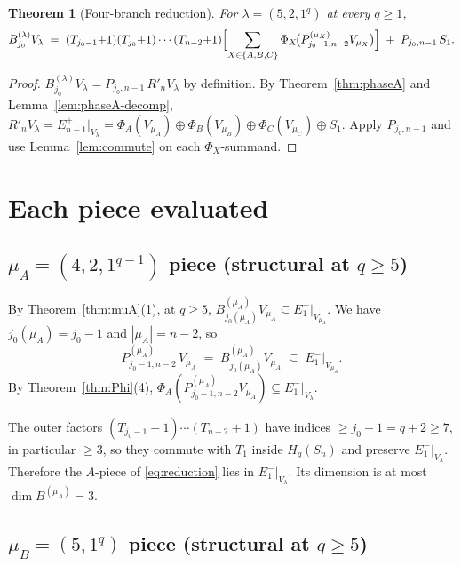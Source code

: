 \documentclass[11pt]{article}
\newtheorem{theorem}{Theorem}
\theoremstyle{definition}
\begin{document}
\begin{theorem}[Four-branch reduction]\label{thm:reduction}
For $\lambda = (5, 2, 1^q)$ at every $q \ge 1$,
\begin{equation}\label{eq:reduction}
   B^{(\lambda)}_{j_0} V_\lambda
   \;=\;
   (T_{j_0-1}{+}1)(T_{j_0}{+}1)\cdots(T_{n-2}{+}1)
   \Bigl[
   \sum_{X \in \{A, B, C\}} \Phi_X\!\big(P^{(\mu_X)}_{j_0-1, n-2} V_{\mu_X}\big)
   \Bigr]
   \;+\; P_{j_0, n-1}\, S_1.
\end{equation}
\end{theorem}

\begin{proof}
$B^{(\lambda)}_{j_0} V_\lambda = P_{j_0, n-1}\, R'_n V_\lambda$ by
definition. By Theorem~\ref{thm:phaseA} and
Lemma~\ref{lem:phaseA-decomp},
$R'_n V_\lambda = E_{n-1}^+|_{V_\lambda} = \Phi_A(V_{\mu_A}) \oplus
\Phi_B(V_{\mu_B}) \oplus \Phi_C(V_{\mu_C}) \oplus S_1$. Apply
$P_{j_0, n-1}$ and use Lemma~\ref{lem:commute} on each $\Phi_X$-summand.
\end{proof}

\section{Each piece evaluated}\label{sec:pieces}

\subsection{$\mu_A = (4, 2, 1^{q-1})$ piece (structural at $q \ge 5$)}\label{ssec:muA-piece}

By Theorem~\ref{thm:muA}(1), at $q \ge 5$,
$B^{(\mu_A)}_{j_0(\mu_A)} V_{\mu_A} \subseteq E_1^-|_{V_{\mu_A}}$.
We have $j_0(\mu_A) = j_0 - 1$ and $|\mu_A| = n - 2$, so
\[
   P^{(\mu_A)}_{j_0 - 1, n - 2}\, V_{\mu_A}
   \;=\; B^{(\mu_A)}_{j_0(\mu_A)} V_{\mu_A}
   \;\subseteq\; E_1^-|_{V_{\mu_A}}.
\]
By Theorem~\ref{thm:Phi}(4),
$\Phi_A(P^{(\mu_A)}_{j_0 - 1, n - 2} V_{\mu_A}) \subseteq E_1^-|_{V_\lambda}$.

The outer factors $(T_{j_0-1}{+}1)\cdots(T_{n-2}{+}1)$ have indices
$\ge j_0 - 1 = q + 2 \ge 7$, in particular $\ge 3$, so they commute
with $T_1$ inside $H_q(S_n)$ and preserve $E_1^-|_{V_\lambda}$.
Therefore the $A$-piece of \eqref{eq:reduction} lies in
$E_1^-|_{V_\lambda}$. Its dimension is at most $\dim B^{(\mu_A)} = 3$.

\subsection{$\mu_B = (5, 1^q)$ piece (structural at $q \ge 5$)}\label{ssec:muB-piece}
\end{document}
